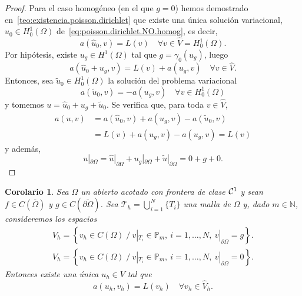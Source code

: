 \documentclass[11pt]{report}
\theoremstyle{plain}
\newtheorem{corolary}[theorem]{Corolario}
\theoremstyle{definition}
\newcommand{\N}{\ensuremath{\mathbb{N}}}
\newcommand{\Th}{\ensuremath{\mathcal{T}_h}\xspace}
\renewcommand{\P}{\ensuremath{\mathbb{P}}}
\newcommand{\classC}[2]{%
  \ensuremath{
   \ifthenelse{\equal{#2}{}}
    {\mathcal{C}^{#1}}
    {\mathcal{C}^{#1}(#2)}
  }
}
\begin{document}
\begin{proof}
  Para el caso homogéneo (en el que $g=0$) hemos demostrado en~\eqref{teo:existencia.poisson.dirichlet} que existe una única solución variacional, $\widehat u_0\in  H_0^1(\Omega)$ de~\eqref{eq:poisson.dirichlet.NO.homog}, es decir,
  \begin{displaymath}
    a(\widehat u_0,v) = L(v) \quad\forall v\in \widehat V = H_0^1(\Omega).
  \end{displaymath}
%
  Por hipótesis, existe $u_g\in H^1(\Omega)$ tal que $g=\gamma_0(u_g)$, luego
  \begin{displaymath}
    a(\widehat u_0 + u_g, v) = L(v) + a(u_g,v) \quad\forall v\in \widehat V.
  \end{displaymath}
%
  Entonces, sea $\widetilde u_0\in H_0^1(\Omega)$ la solución del problema variacional
  \begin{equation}
    a(\widetilde u_0,v) = -a(u_g, v) \quad\forall v\in H_0^1(\Omega)
  \end{equation}
  y tomemos $u=\widehat u_0 + u_g + \widetilde u_0$.
  Se verifica que, para toda $v\in \widehat V$,
  \begin{align*}
    a(u,v) &= a(\widehat u_0, v) + a(u_g,v) - a(\widetilde u_0, v) \\
           &= L(v) +a(u_g,v) - a(u_g,v) = L(v)
  \end{align*}
  y además,
  \[
    u|_{\partial\Omega} = \widehat u|_{\partial\Omega} + u_g|_{\partial\Omega} + \widetilde u|_{\partial\Omega} 
    = 0 + g + 0.
  \]
\end{proof}

\begin{corolary} Sea $\Omega$ un abierto acotado con frontera de clase $\classC1{}$ y sean $f\in C(\overline\Omega)$ y $g\in C(\overline{\partial\Omega})$. Sea $\Th=\bigcup_{i=1}^N\{T_i\}$ una malla de $\Omega$ y, dado $m\in\N$, consideremos los espacios
  \begin{align*}
    V_h = \left\{ v_h\in C(\Omega)\; / \ v|_{T_i} \in\P_m, \ i=1,\dots,N, \ v|_{\partial\Omega} = g \right\}.
    \\
    \widehat V_h = \left\{ v_h\in C(\Omega)\; / \ v|_{T_i} \in\P_m, \ i=1,\dots,N, \ v|_{\partial\Omega} = 0 \right\}.
  \end{align*} 
  Entonces existe una única $u_h\in V$ tal que
  \begin{equation}
    \label{eq:problema.elementos-finitos}
    a(u_h,v_h) = L(v_h) \quad\forall v_h\in \widehat V_h.
  \end{equation}

\end{corolary}
\end{document}
